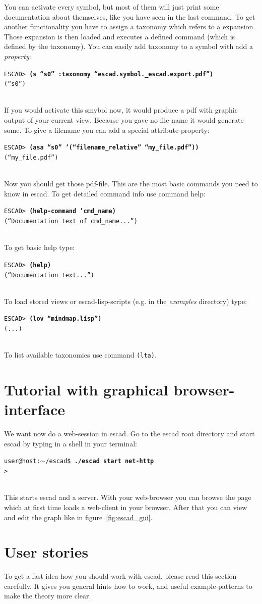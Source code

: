 \documentclass[a4paper, 12pt, openany]{scrbook}
\makeatletter
\newcommand{\shellcmdline}[2]{\\
  \setlength{\fboxsep}{2pt}\colorbox{black!20}{\parbox{\textwidth}{\texttt{user@host:$\sim$/escad\$ \textbf{#1}\\#2}}}\\}
\newcommand{\escadcmdline}[2]{\\\setlength{\fboxsep}{2pt}\colorbox{black!20}{\parbox{\textwidth}{\texttt{ESCAD> \textbf{#1}\\#2}}}\\}
\makeatother
\begin{document}
You can activate every symbol, but most of them will just print some documentation about themselves, like you have seen in the last command. To get another functionality you have to assign a taxonomy which refers to a expansion. Those expansion is then loaded and executes a defined command (which is defined by the taxonomy).
You can easily add taxonomy to a symbol with add a \emph{property}:
\escadcmdline{(s ``s0'' :taxonomy ``escad.symbol.\_escad.export.pdf'')}{(``s0'')}
If you would activate this smybol now, it would produce a pdf with graphic output of your current view. Because you gave no file-name it would generate some. To give a filename you can add a special attribute-property:
\escadcmdline{(asa ``s0'' '(``filename\_relative'' ``my\_file.pdf''))}{(``my\_file.pdf'')}
Now you should get those pdf-file.
This are the most basic commands you need to know in escad. To get detailed command info use command help:
\escadcmdline{(help-command 'cmd\_name)}{(``Documentation text of cmd\_name...'')}
To get basic help type:
\escadcmdline{(help)}{(``Documentation text...'')}
To load stored views or escad-lisp-scripts (e.g. in the \emph{examples} directory) type:
\escadcmdline{(lov ``mindmap.lisp'')}{(...)}
To list available taxonomies use command \texttt{(lta)}.
\section{Tutorial with graphical browser-interface}
We want now do a web-session in escad. Go to the escad root directory and start escad by typing in a shell in your terminal:
\shellcmdline{./escad start net-http}{>}
This starts escad and a server. With your web-browser you can browse the page which at first time loads a web-client in your browser. After that you can view and edit the graph like in figure~\ref{fig:escad_gui}.
\section{User stories}
To get a fast idea how you should work with escad, please read this section carefully. It gives you general hints how to work, and useful example-patterns to make the theory more clear.
\end{document}
